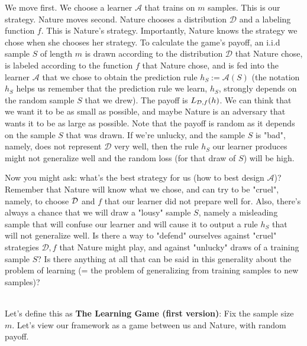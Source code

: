 {We move first. We choose a learner $\mathcal{A}$ that trains on $m$ samples. This is our strategy.
Nature moves second. Nature chooses a distribution $\mathcal{D}$ and a labeling function $f$. This is Nature's strategy. Importantly, Nature knows the strategy we chose when she chooses her strategy.
To calculate the game's payoff, an i.i.d sample $S$ of length $m$ is drawn according to the distribution $\mathcal{D}$ that Nature chose, is labeled according to the function $f$ that Nature chose, and is fed into the learner $\mathcal{A}$ that we chose to obtain the prediction rule $h_S:=\mathcal{A}(S)$ (the notation $h_S$ helps us remember that the prediction rule we learn, $h_S$, strongly depends on the random sample $S$ that we drew). The payoff is $L_{\mathcal{D},f}(h)$. We can think that we want it to be as small as possible, and maybe Nature is an adversary that wants it to be as large as possible. Note that the payoff is random as it depends on the sample $S$ that was drawn. If we're unlucky, and the sample $S$ is "bad", namely, does not represent $\mathcal{D}$ very well, then the rule $h_S$ our learner produces might not generalize well and the random loss (for that draw of $S$) will be high. 

Now you might ask: what's the best strategy for us (how to best design $\mathcal{A}$)? 
Remember that Nature will know what we chose, and can try to be "cruel", namely, to choose $\mathcal{D}$ and $f$ that our learner did not prepare well for. Also, there's always a chance that we will draw a "lousy" sample $S$, namely a misleading sample that will confuse our learner and will cause it to output a rule $h_S$ that will not generalize well. Is there a way to "defend" ourselves against "cruel" strategies $\mathcal{D},f$ that Nature might play, and against "unlucky" draws of a training sample $S$? Is there anything at all that can be said in this generality about the problem of learning (= the problem of generalizing from training samples to new samples)? 

~\\
Let's define this as {\bf The Learning Game (first version)}:
Fix the sample size $m$. Let's view our framework as a game between us and
  Nature, with random payoff.
  \begin{itemize}
  

\end{itemize}}
